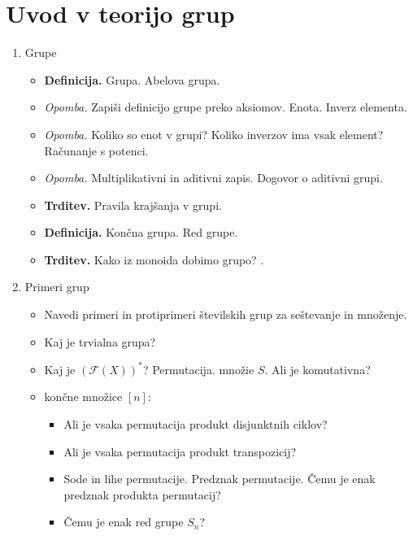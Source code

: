 \section{Uvod v teorijo grup}

\begin{enumerate}
    \item Grupe
    \begin{itemize}
        \item \colorbox{purple!30}{\textbf{Definicija.}} Grupa. Abelova grupa.
        \item \colorbox{yellow!30}{\emph{Opomba.}} Zapiši definicijo grupe preko aksiomov. Enota. Inverz elementa.
        \item \colorbox{yellow!30}{\emph{Opomba.}} Koliko so enot v grupi? Koliko inverzov ima vsak element? Računanje s potenci.
        \item \colorbox{yellow!30}{\emph{Opomba.}} Multiplikativni in aditivni zapis. Dogovor o aditivni grupi.
        \item \colorbox{blue!30}{\textbf{Trditev.}} Pravila krajšanja v grupi.
        \item \colorbox{purple!30}{\textbf{Definicija.}} Končna grupa. Red grupe.
        \item \colorbox{blue!30}{\textbf{Trditev.}} Kako iz monoida dobimo grupo? .    
    \end{itemize}
    \item Primeri grup
    \begin{itemize}
        \item Navedi primeri in protiprimeri številskih grup za seštevanje in množenje.
        \item Kaj je trvialna grupa?
        \item Kaj je $(\mathcal{F}(X))^*$? Permutacija.  množie $S$. Ali je komutativna?
        \item {} končne množice $[n]$:
        \begin{itemize}
            \item Ali je vsaka permutacija produkt disjunktnih ciklov?
            \item Ali je vsaka permutacija produkt transpozicij?
            \item Sode in lihe permutacije. Predznak permutacije. Čemu je enak predznak produkta permutacij?
            \item Čemu je enak red grupe $S_n$?
        \end{itemize}

\end{itemize}
\end{enumerate}
